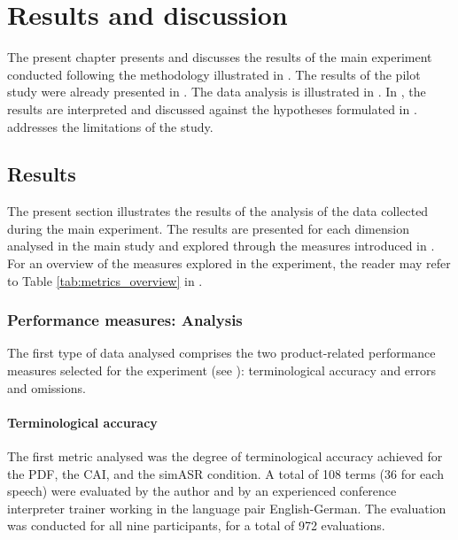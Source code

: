 \chapter{Results and discussion} \label{chapter6}
The present chapter presents and discusses the results of the main experiment conducted following the methodology illustrated in . The results of the pilot study were already presented in . The data analysis is illustrated in . In , the results are interpreted and discussed against the hypotheses formulated in .  addresses the limitations of the study.

\section{Results} \label{results_MS}
The present section illustrates the results of the analysis of the data collected during the main experiment. The results are presented for each dimension analysed in the main study and explored through the measures introduced in . For an overview of the measures explored in the experiment, the reader may refer to Table \ref{tab:metrics_overview} in .

\subsection{Performance measures: Analysis} \label{performanceresults}
The first type of data analysed comprises the two product-related performance measures selected for the experiment (see ): terminological accuracy and errors and omissions.
\subsubsection{Terminological accuracy} \label{accuracy}
The first metric analysed was the degree of terminological accuracy achieved for the PDF, the CAI, and the simASR condition. A total of 108 terms (36 for each speech) were evaluated by the author and by an experienced conference interpreter trainer working in the language pair English-German. The evaluation was conducted for all nine participants, for a total of 972 evaluations.

